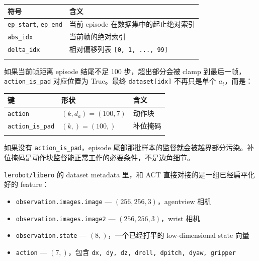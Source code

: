 \documentclass[
  chinese,
]{ctexart}
\providecommand{\tightlist}{%
  \setlength{\itemsep}{0pt}\setlength{\parskip}{0pt}}
\begin{document}
\begin{center}
\begin{tabular}{@{}>{\raggedright\arraybackslash}p{} >{\raggedright\arraybackslash}p{}@{}}
\toprule\noalign{}
符号 & 含义 \\
\midrule\noalign{}
\texttt{ep\_\allowbreak start}, \texttt{ep\_\allowbreak end} & 当前 episode 在数据集中的起止绝对索引 \\
\texttt{abs\_\allowbreak idx} & 当前帧的绝对索引 \\
\texttt{delta\_\allowbreak idx} & 相对偏移列表 \texttt{{[}0,\ 1,\ ...,\ 99{]}} \\
\bottomrule\noalign{}
\end{tabular}
\end{center}

如果当前帧距离 episode 结尾不足 100 步，超出部分会被 clamp
到最后一帧，\texttt{action\_is\_pad} 对应位置为 True。最终
\texttt{dataset{[}idx{]}} 不再只是单个 \(a_t\)，而是：

\begin{center}
\begin{tabular}{@{}>{\raggedright\arraybackslash}p{} >{\raggedright\arraybackslash}p{} >{\raggedright\arraybackslash}p{}@{}}
\toprule\noalign{}
键 & 形状 & 含义 \\
\midrule\noalign{}
\texttt{action} & \((k, d_a) = (100, 7)\) & 动作块 \\
\texttt{action\_\allowbreak is\_\allowbreak pad} & \((k,) = (100,)\) & 补位掩码 \\
\bottomrule\noalign{}
\end{tabular}
\end{center}

如果没有 \texttt{action\_is\_pad}，episode
尾部那批样本的监督就会被越界部分污染。补位掩码是动作块监督能正常工作的必要条件，不是边角细节。

\texttt{lerobot/libero} 的 dataset metadata 里，和 ACT
直接对接的是一组已经扁平化好的 feature：

\begin{itemize}
\tightlist
\item
  \texttt{observation.images.image} --- \((256, 256, 3)\)，agentview
  相机
\item
  \texttt{observation.images.image2} --- \((256, 256, 3)\)，wrist 相机
\item
  \texttt{observation.state} --- \((8,)\)，一个已经打平的
  low-dimensional state 向量
\item
  \texttt{action} --- \((7,)\)，包含
  \texttt{dx,\ dy,\ dz,\ droll,\ dpitch,\ dyaw,\ gripper}
\end{itemize}
\end{document}
